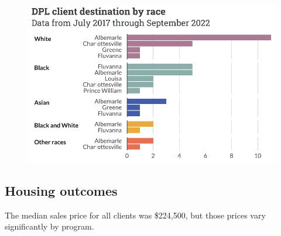 \documentclass[
  letterpaper,
  DIV=11,
  numbers=noendperiod]{scrartcl}
\begin{document}
\begin{figure}[H]

{\centering \includegraphics{piedmont_files/figure-pdf/client-moves-race-1.pdf}

}

\end{figure}

\hypertarget{housing-outcomes}{%
\subsection{Housing outcomes}\label{housing-outcomes}}

The median sales price for all clients was \$224,500, but those prices
vary significantly by program.
\end{document}
